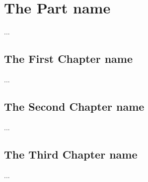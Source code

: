 \documentclass[12pt,a4paper,twoside,twocolumn]{book}
\begin{document}
\part{The Part name}
...
\vspace*{10cm}
\chapter{The First Chapter name}
...
\chapter{The Second Chapter name}
...
\chapter{The Third Chapter name}
...
\end{document}
